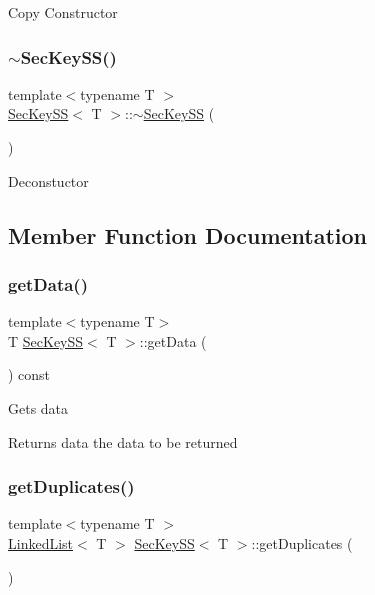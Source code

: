 Copy Constructor \mbox{\label{classSecKeySS_ada9aac8a98536f84b46bc04b7acf9fec}} 
\subsubsection{\texorpdfstring{$\sim$\+Sec\+Key\+S\+S()}{~SecKeySS()}}
{\footnotesize\ttfamily template$<$typename T $>$ \\
\hyperlink{classSecKeySS}{Sec\+Key\+SS}$<$ T $>$\+::$\sim$\hyperlink{classSecKeySS}{Sec\+Key\+SS} (\begin{DoxyParamCaption}{ }\end{DoxyParamCaption})}

Deconstuctor 

\subsection{Member Function Documentation}
\mbox{\label{classSecKeySS_a9fdb8a771250b7aaab556f019b381eab}} 
\subsubsection{\texorpdfstring{get\+Data()}{getData()}}
{\footnotesize\ttfamily template$<$typename T$>$ \\
T \hyperlink{classSecKeySS}{Sec\+Key\+SS}$<$ T $>$\+::get\+Data (\begin{DoxyParamCaption}{ }\end{DoxyParamCaption}) const\hspace{0.3cm}{\ttfamily [inline]}}

Gets data \begin{DoxyReturn}{Returns}
data the data to be returned 
\end{DoxyReturn}
\mbox{\label{classSecKeySS_abef7c9c03e9bc6b818d599966428fdec}} 
\subsubsection{\texorpdfstring{get\+Duplicates()}{getDuplicates()}}
{\footnotesize\ttfamily template$<$typename T $>$ \\
\hyperlink{classLinkedList}{Linked\+List}$<$ T $>$ \hyperlink{classSecKeySS}{Sec\+Key\+SS}$<$ T $>$\+::get\+Duplicates (\begin{DoxyParamCaption}{ }\end{DoxyParamCaption})}

